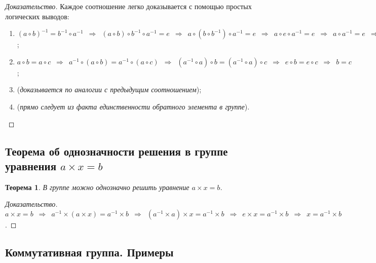 \documentclass{article}
\newtheorem*{theorem*}{Теорема}
\theoremstyle{plain}
\theoremstyle{definition}
\begin{document}
\begin{proof}[Доказательство]
	Каждое соотношение легко доказывается с помощью простых логических выводов:

	\begin{enumerate}
		\item \(
			(a \circ b)^{-1} = b^{-1} \circ a^{-1} \enspace \Rightarrow \enspace
			(a \circ b) \circ b^{-1} \circ a^{-1} {= e} \enspace \Rightarrow \enspace
			a \circ (b \circ b^{-1}) \circ a^{-1} {= e} \enspace \Rightarrow \enspace
			a \circ e \circ a^{-1} {= e} \enspace \Rightarrow \enspace
			a \circ a^{-1} {= e} \enspace \Rightarrow \enspace
			e = e
		\);

		\item \(
			a \circ b = a \circ c \enspace \Rightarrow \enspace
			a^{-1} \circ (a \circ b) = a^{-1} \circ (a \circ c) \enspace \Rightarrow \enspace
			(a^{-1} \circ a) \circ b = (a^{-1} \circ a) \circ c \enspace \Rightarrow \enspace
			e \circ b = e \circ c \enspace \Rightarrow \enspace
			b = c
		\);

		\item (\textit{доказывается по аналогии с предыдущим соотношением});

		\item (\textit{прямо следует из факта единственности обратного элемента в группе}).
	\end{enumerate}
\end{proof}

\subsection{Теорема об однозначности решения в группе уравнения \(a \times x = b\)}

\begin{theorem*}
	В группе можно однозначно решить уравнение \(a \times x = b\).
\end{theorem*}

\begin{proof}[Доказательство]
	\(a \times x = b \enspace \Rightarrow \enspace
	a^{-1} \times (a \times x) = a^{-1} \times b \enspace \Rightarrow \enspace
	(a^{-1} \times a) \times x = a^{-1} \times b \enspace \Rightarrow \enspace
	e \times x = a^{-1} \times b \enspace \Rightarrow \enspace
	x = a^{-1} \times b\).
\end{proof}

\subsection{Коммутативная группа. Примеры}
\end{document}
